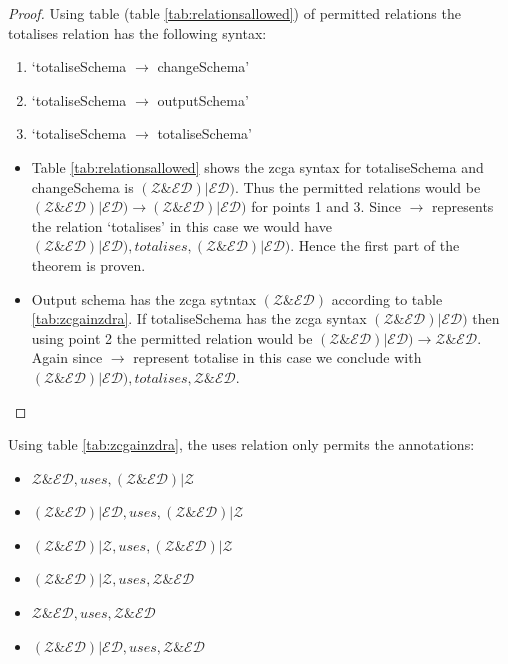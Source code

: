 \begin{proof}
Using table (table \ref{tab:relationsallowed}) of permitted relations the
totalises relation has the following syntax:
\begin{enumerate}
\item `totaliseSchema $\longrightarrow$ changeSchema'
\item `totaliseSchema $\longrightarrow$ outputSchema'
\item `totaliseSchema $\longrightarrow$ totaliseSchema'
\end{enumerate} 

\begin{itemize}
\item Table \ref{tab:relationsallowed} shows the \gls{zcga} syntax for
totaliseSchema and changeSchema is $(\mathcal{Z} \& \mathcal{ED}) |
\mathcal{ED})$. Thus the permitted relations would be $(\mathcal{Z} \&
\mathcal{ED}) | \mathcal{ED}) \longrightarrow (\mathcal{Z} \& \mathcal{ED}) |
\mathcal{ED})$ for points 1 and 3. Since $\longrightarrow$ represents the
relation `totalises' in this case we would have $(\mathcal{Z} \& \mathcal{ED}) |
\mathcal{ED}), totalises, (\mathcal{Z} \& \mathcal{ED}) | \mathcal{ED})$. Hence
the first part of the theorem is proven.

\item Output schema has the \gls{zcga} sytntax $(\mathcal{Z} \& \mathcal{ED})$
according to table \ref{tab:zcgainzdra}. If totaliseSchema has the \gls{zcga}
syntax $(\mathcal{Z} \& \mathcal{ED}) | \mathcal{ED})$ then using point 2 the
permitted relation would be $(\mathcal{Z} \& \mathcal{ED}) | \mathcal{ED})
\longrightarrow \mathcal{Z} \& \mathcal{ED}$. Again since $\longrightarrow$
represent totalise in this case we conclude with $(\mathcal{Z} \& \mathcal{ED})
| \mathcal{ED}), totalises, \mathcal{Z} \& \mathcal{ED}$.
\end{itemize}
\end{proof}

\begin{thm}
Using table \ref{tab:zcgainzdra}, the uses relation only permits the
annotations:
\begin{itemize}
\item $\mathcal{Z} \& \mathcal{ED}, uses, (\mathcal{Z} \& \mathcal{ED}) |
\mathcal{Z}$
\item $(\mathcal{Z} \& \mathcal{ED}) | \mathcal{ED}, uses, (\mathcal{Z} \&
\mathcal{ED}) | \mathcal{Z}$
\item $(\mathcal{Z} \& \mathcal{ED}) | \mathcal{Z}, uses, (\mathcal{Z} \&
\mathcal{ED}) | \mathcal{Z}$
\item $(\mathcal{Z} \& \mathcal{ED}) | \mathcal{Z}, uses, \mathcal{Z} \&
\mathcal{ED}$
\item $\mathcal{Z} \& \mathcal{ED}, uses, \mathcal{Z} \& \mathcal{ED}$
\item $(\mathcal{Z} \& \mathcal{ED}) | \mathcal{ED}, uses, \mathcal{Z} \&
\mathcal{ED}$
\end{itemize}
\end{thm}


